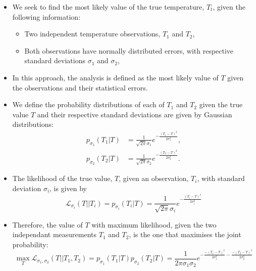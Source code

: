 \begin{itemize}
    \item We seek to find the most likely value of the true temperature, $T_t$, given the following information:
    \begin{itemize}
        \item Two independent temperature observations, $T_1$ and $T_2$,
        \item Both observations have normally distributed errors, with respective standard deviations $\sigma_1$ and $\sigma_2$,
    \end{itemize}
    \item In this approach, the analysis is defined as the most likely value of $T$ given the observations and their statistical errors.
    \item We define the probability distributions of each of $T_1$ and $T_2$ given the true value $T$ and their respective standard deviations are given by Gaussian distributions:
    \begin{subequations}
        \begin{align}
            p_{\sigma_1} \left( T_1 | T \right) &= \frac{1}{\sqrt{2 \pi} \sigma_1} e^{-\frac{\left( T_1 - T \right)^2}{2 \sigma_1^2}}, \\
            p_{\sigma_2} \left( T_2 | T \right) &= \frac{1}{\sqrt{2 \pi} \sigma_2} e^{-\frac{\left( T_2 - T \right)^2}{2 \sigma_2^2}}.
        \end{align}
    \end{subequations}
    \item The likelihood of the true value, $T$, given an observation, $T_i$, with standard deviation $\sigma_i$, is given by
    \begin{equation}
        \mathcal{L}_{\sigma_i} \left( T || T_i \right) = 
            p_{\sigma_i} \left( T_i | T \right) =
            \frac{1}{\sqrt{2 \pi}\sigma_i} e^{-\frac{\left( T_i - T \right)^2}{2 \sigma_i^2}}
    \end{equation}
    \item Therefore, the value of $T$ with maximum likelihood, given the two independant measurements $T_1$ and $T_2$, is the one that maximises the joint probability:
    \begin{equation}
        \max\limits_{T} \mathcal{L}_{\sigma_1, \sigma_2} \left( T || T_1, T_2 \right) = 
        p_{\sigma_1} \left( T_1 | T \right)
        p_{\sigma_2} \left( T_2 | T \right) = 
        \frac{1}{2 \pi \sigma_1 \sigma_2} e^{-\frac{-\left( T_1 - T \right)^2}{2 \sigma_1^2} - \frac{-\left( T_2 - T \right)^2}{2 \sigma_2^2}}

\end{equation}
\end{itemize}
